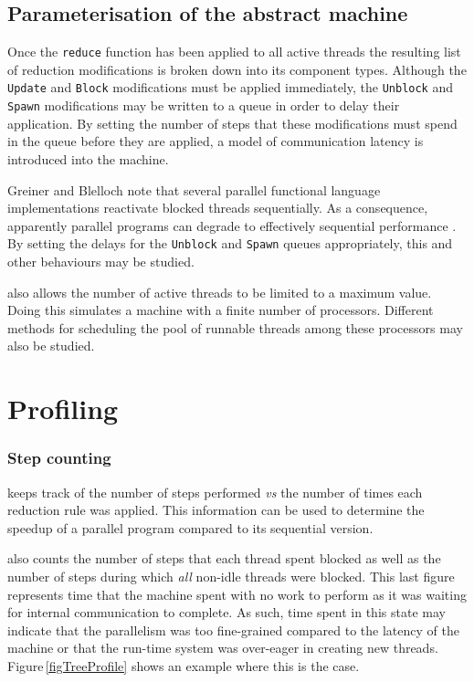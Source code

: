 \documentclass{llncs}
\begin{document}
\subsection{Parameterisation of the abstract machine}

Once the \texttt{reduce} function has been applied to all active threads the resulting list of reduction modifications is broken down into its component types. Although the \texttt{Update} and \texttt{Block} modifications must be applied immediately, the \texttt{Unblock} and \texttt{Spawn} modifications may be written to a queue in order to delay their application. By setting the number of steps that these modifications must spend in the queue before they are applied, a model of communication latency is introduced into the machine.

Greiner and Blelloch note that several parallel functional language implementations reactivate blocked threads sequentially. As a consequence, apparently parallel programs can degrade to effectively sequential performance \cite{greiner:popl96}. By setting the delays for the \texttt{Unblock} and \texttt{Spawn} queues appropriately, this and other behaviours may be studied. 

\ample also allows the number of active threads to be limited to a maximum value. Doing this simulates a machine with a finite number of processors. Different methods for scheduling the pool of runnable threads among these processors may also be studied.


\section{Profiling}

\subsubsection{Step counting}
\ample keeps track of the number of steps performed \textit{vs} the number of times each reduction rule was applied. This information can be used to determine the speedup of a parallel program compared to its sequential version. 

\ample also counts the number of steps that each thread spent blocked as well as the number of steps during which \emph{all} non-idle threads were blocked. This last figure represents time that the machine spent with no work to perform as it was waiting for internal communication to complete. As such, time spent in this state may indicate that the parallelism was too fine-grained compared to the latency of the machine or that the run-time system was over-eager in creating new threads. Figure\,\ref{figTreeProfile} shows an example where this is the case.
\end{document}

